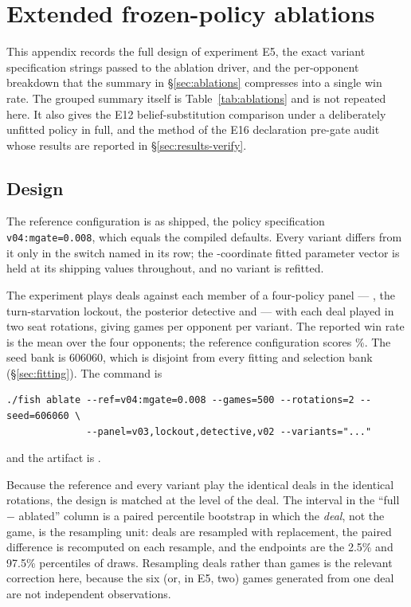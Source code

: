 \section{Extended frozen-policy ablations}
\label{app:ablations}

This appendix records the full design of experiment E5, the exact variant
specification strings passed to the ablation driver, and the per-opponent
breakdown that the summary in \S\ref{sec:ablations} compresses into a single
win rate. The grouped summary itself is Table~\ref{tab:ablations} and is not
repeated here. It also gives the E12 belief-substitution comparison under a
deliberately unfitted policy in full, and the method of the E16 declaration
pre-gate audit whose results are reported in \S\ref{sec:results-verify}.

\subsection{Design}
\label{app:abl-design}

The reference configuration is \vfast{} as shipped, the policy specification
\texttt{v04:mgate=0.008}, which equals the compiled defaults. Every variant
differs from it only in the switch named in its row; the \numParams{}-coordinate
fitted parameter vector is held at its shipping values throughout, and no
variant is refitted.

The experiment plays \numAblDeals{} deals against each member of a four-policy
panel --- \vthree{}, the turn-starvation lockout, the posterior detective and
\vtwo{} --- with each deal played in two seat rotations, giving \numAblGames{}
games per opponent per variant. The reported win rate is the mean over the four
opponents; the reference configuration scores \numAblRef\%. The seed bank is
606060, which is disjoint from every fitting and selection bank
(\S\ref{sec:fitting}). The command is

\begin{verbatim}
./fish ablate --ref=v04:mgate=0.008 --games=500 --rotations=2 --seed=606060 \
              --panel=v03,lockout,detective,v02 --variants="..."
\end{verbatim}

and the artifact is .

Because the reference and every variant play the identical deals in the
identical rotations, the design is matched at the level of the deal. The
interval in the ``full $-$ ablated'' column is a paired percentile bootstrap in
which the \emph{deal}, not the game, is the resampling unit: deals are resampled
with replacement, the paired difference is recomputed on each resample, and the
endpoints are the 2.5\% and 97.5\% percentiles of \numBootstrapDraws{} draws.
Resampling
deals rather than games is the relevant correction here, because the six (or, in
E5, two) games generated from one deal are not independent observations.

